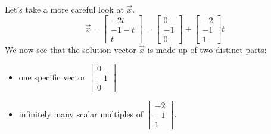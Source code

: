 \documentclass{ximera}
\begin{document}
\begin{initprob}
 Let's take a more careful look at $\vec{x}$.
 $$\vec{x}=\begin{bmatrix}-2t\\-1-t\\t\end{bmatrix}=\begin{bmatrix}0\\-1\\0\end{bmatrix}+\begin{bmatrix}-2\\-1\\1\end{bmatrix}t$$
 We now see that the solution vector $\vec{x}$ is made up of two distinct parts: 
 \begin{itemize}
 \item
 one specific vector $\begin{bmatrix}0\\-1\\0\end{bmatrix}$
 \item
 infinitely many scalar multiples of $\begin{bmatrix}-2\\-1\\1\end{bmatrix}$.  
 \end{itemize}
 

\end{initprob}
\end{document}

